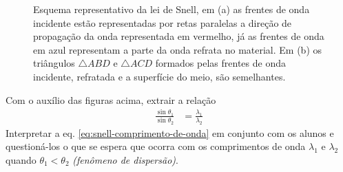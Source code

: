     \vspace{10pt}
    \begin{figure}[!ht]        
        \centering              
        \hspace{20pt}
        \caption{Esquema representativo da lei de Snell, em (a) as frentes de onda incidente estão representadas por retas paralelas a direção de propagação da onda representada em vermelho, já as frentes de onda em azul representam a parte da onda refrata no material. Em (b) os triângulos $\triangle ABD$ e $\triangle ACD$ formados pelas frentes de onda incidente, refratada e a superfície do meio, são semelhantes.}
        \label{fig:snell-deducao}
  \end{figure}        
  \vspace*{10pt}

  Com o auxílio das figuras acima, extrair a relação
  \begin{align}
  \label{eq:snell-comprimento-de-onda}
      \frac{\sin\theta_1}{\sin\theta_2}&=\frac{\lambda_1}{\lambda_2}
  \end{align}
  Interpretar a eq. \eqref{eq:snell-comprimento-de-onda} em conjunto com os alunos e questioná-los o que se espera que ocorra com os comprimentos de onda $\lambda_1$ e $\lambda_2$ quando $\theta_1<\theta_2$ \emph{(fenômeno de dispersão)}.

